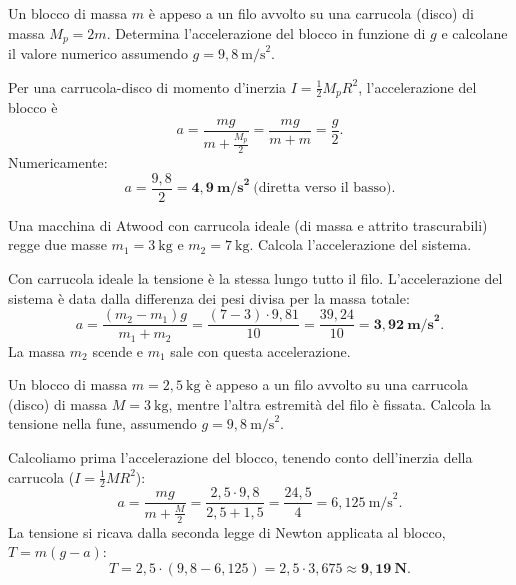 
\begin{question}[ID=7.2, subtitle={Massa appesa a carrucola di massa doppia}, tags={corpo rigido, macchina di Atwood, carrucola}, difficulty=media]
Un blocco di massa $m$ è appeso a un filo avvolto su una carrucola (disco) di massa $M_p = 2m$. Determina l'accelerazione del blocco in funzione di $g$ e calcolane il valore numerico assumendo $g = 9{,}8\ \text{m/s}^2$.
\begin{solution}
Per una carrucola-disco di momento d'inerzia $I = \tfrac{1}{2}M_p R^2$, l'accelerazione del blocco è
\[
a = \frac{mg}{m + \tfrac{M_p}{2}} = \frac{mg}{m + m} = \frac{g}{2}.
\]
Numericamente:
\[
a = \frac{9{,}8}{2} = \mathbf{4{,}9\ \text{m/s}^2}\ \text{(diretta verso il basso)}.
\]
\end{solution}
\end{question}


\begin{question}[ID=7.3, subtitle={Macchina di Atwood ideale con m₁ = 3 kg e m₂ = 7 kg}, tags={corpo rigido, macchina di Atwood}, difficulty=facile]
Una macchina di Atwood con carrucola ideale (di massa e attrito trascurabili) regge due masse $m_1 = 3\ \text{kg}$ e $m_2 = 7\ \text{kg}$. Calcola l'accelerazione del sistema.
\begin{solution}
Con carrucola ideale la tensione è la stessa lungo tutto il filo. L'accelerazione del sistema è data dalla differenza dei pesi divisa per la massa totale:
\[
a = \frac{(m_2 - m_1)g}{m_1 + m_2} = \frac{(7-3)\cdot 9{,}81}{10} = \frac{39{,}24}{10} = \mathbf{3{,}92\ \text{m/s}^2}.
\]
La massa $m_2$ scende e $m_1$ sale con questa accelerazione.
\end{solution}
\end{question}


\begin{question}[ID=7.4, subtitle={Tensione nella fune di Atwood con carrucola massiva}, tags={corpo rigido, macchina di Atwood, carrucola}, difficulty=media]
Un blocco di massa $m = 2{,}5\ \text{kg}$ è appeso a un filo avvolto su una carrucola (disco) di massa $M = 3\ \text{kg}$, mentre l'altra estremità del filo è fissata. Calcola la tensione nella fune, assumendo $g = 9{,}8\ \text{m/s}^2$.
\begin{solution}
Calcoliamo prima l'accelerazione del blocco, tenendo conto dell'inerzia della carrucola ($I = \tfrac{1}{2}MR^2$):
\[
a = \frac{mg}{m + \tfrac{M}{2}} = \frac{2{,}5\cdot 9{,}8}{2{,}5 + 1{,}5} = \frac{24{,}5}{4} = 6{,}125\ \text{m/s}^2.
\]
La tensione si ricava dalla seconda legge di Newton applicata al blocco, $T = m(g - a)$:
\[
T = 2{,}5\cdot(9{,}8 - 6{,}125) = 2{,}5\cdot 3{,}675 \approx \mathbf{9{,}19\ \text{N}}.
\]
\end{solution}
\end{question}

